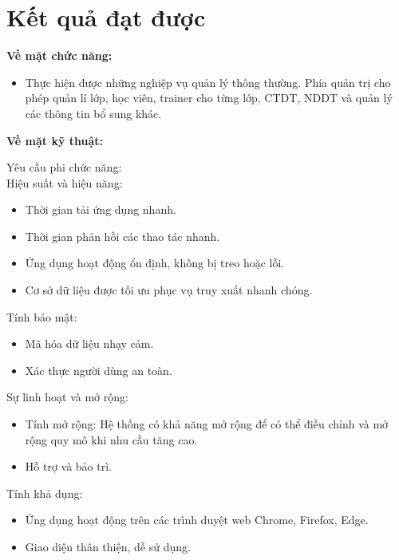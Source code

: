 \documentclass[report.tex]{subfiles}
\begin{document}
\pagebreak


\section*{Kết quả đạt được}

\textbf{Về mặt chức năng:}

\begin{itemize}[noitemsep]
\item Thực hiện được những nghiệp vụ quản lý thông thường.
Phía quản trị cho phép quản lí lớp, học viên, trainer cho từng lớp, CTDT, NDDT và quản lý các thông tin bổ sung khác.
\end{itemize}

\textbf{Về mặt kỹ thuật:}

Yêu cầu phi chức năng:\\

Hiệu suất và hiệu năng:
\begin{itemize}[noitemsep]
\item Thời gian tải ứng dụng nhanh.
\item Thời gian phản hồi các thao tác nhanh.
\item Ứng dụng hoạt động ổn định, không bị treo hoặc lỗi.
\item Cơ sở dữ liệu được tối ưu phục vụ truy xuất nhanh chóng.
\end{itemize}

Tính bảo mật:
\begin{itemize}[noitemsep]
\item Mã hóa dữ liệu nhạy cảm.
\item Xác thực người dùng an toàn.
\end{itemize}

Sự linh hoạt và mở rộng:
\begin{itemize}[noitemsep]
\item Tính mở rộng: Hệ thống có khả năng mở rộng để có thể điều chỉnh và mở rộng quy mô khi nhu cầu tăng cao.
\item Hỗ trợ và bảo trì.
\end{itemize}

Tính khả dụng:
\begin{itemize}[noitemsep]
\item Ứng dụng hoạt động trên các trình duyệt web Chrome, Firefox, Edge.
\item Giao diện thân thiện, dễ sử dụng.
\end{itemize}
\end{document}
